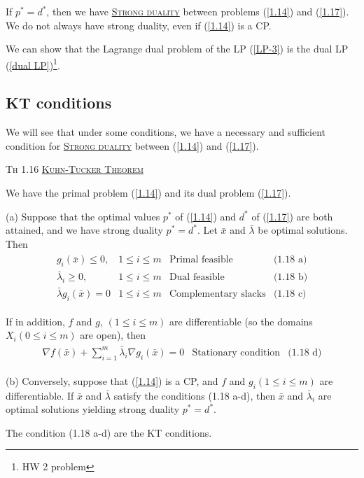If $p^* = d^*$, then we have \underline{\textcolor{MarkerColour}{\textsc{Strong duality}}} between problems (\ref{1.14}) and (\ref{1.17}). We do not always have strong duality, even if (\ref{1.14}) is a CP.

We can show that the Lagrange dual problem of the LP (\ref{LP-3}) is the dual LP (\ref{dual LP})\footnote{HW 2 problem}.

\subsection{KT conditions}
We will see that under some conditions, we have a necessary and sufficient condition for \underline{\textcolor{MarkerColour}{\textsc{Strong duality}}} between (\ref{1.14}) and (\ref{1.17}).

\begin{theorem}
    \textsc{Th 1.16} \underline{\textcolor{MarkerColour}{\textsc{Kuhn-Tucker Theorem}}}
    \par We have the primal problem (\ref{1.14}) and its dual problem (\ref{1.17}).

    (a) Suppose that the optimal values $p^*$ of (\ref{1.14}) and $d^*$ of (\ref{1.17}) are both attained, and we have strong duality $p^* = d^*$. Let $\bar{x}$ and $\bar{\lambda}$ be optimal solutions. Then
    \begin{align}
        \begin{array}{rlll}
             g_i(\bar{x})\le 0, & 1\le i\le m & \text{Primal feasible} & \text{(1.18 a)} \\
            \bar{\lambda}_i \ge 0, & 1\le i\le m & \text{Dual feasible} & \text{(1.18 b)}\\
            \bar{\lambda}g_i(\bar{x}) = 0 & 1\le i\le m & \text{Complementary slacks} & \text{(1.18 c)}
        \end{array}\label{1.18}
    \end{align}

    If in addition, $f$ and $g$, $(1\le i\le m)$ are differentiable (so the domains $X_i (0\le i\le m)$ are open), then
    \begin{align*}
        \begin{array}{lll}
            \nabla f(\bar{x}) + \sum\limits_{i=1}^m \bar{\lambda}_i \nabla g_i(\bar{x}) = 0 & \text{Stationary condition} & \text{(1.18 d)}
        \end{array}
    \end{align*}

    (b) Conversely, suppose that (\ref{1.14}) is a CP, and $f$ and $g_i (1\le i\le m)$ are differentiable. If $\bar{x}$ and $\bar{\lambda}$ satisfy the conditions (1.18 a-d), then $\bar{x}$ and $\bar{\lambda}_i$ are optimal solutions yielding strong duality $p^* = d^*$.

    The condition (1.18 a-d) are the KT conditions.
\end{theorem}
